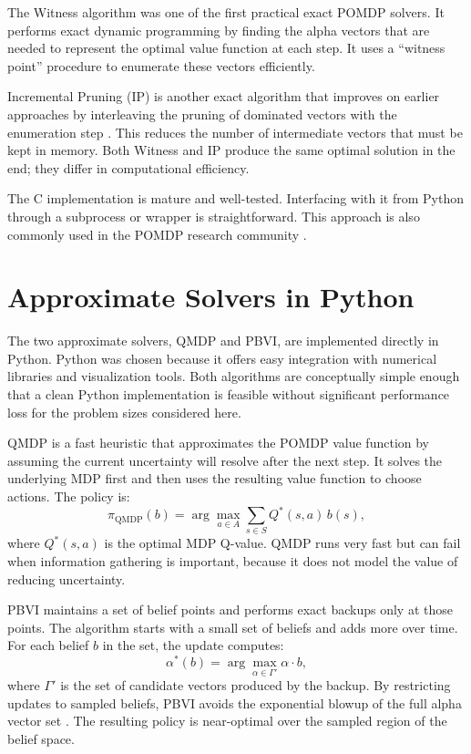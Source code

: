 The Witness algorithm was one of the first practical exact POMDP solvers.
It performs exact dynamic programming by finding the alpha vectors that are needed to represent the optimal value function at each step.
It uses a ``witness point'' procedure to enumerate these vectors efficiently.

Incremental Pruning (IP) is another exact algorithm that improves on earlier approaches by interleaving the pruning of dominated vectors with the enumeration step \cite{incrementalPruningNotes}.
This reduces the number of intermediate vectors that must be kept in memory.
Both Witness and IP produce the same optimal solution in the end; they differ in computational efficiency.

The C implementation is mature and well-tested.
Interfacing with it from Python through a subprocess or wrapper is straightforward.
This approach is also commonly used in the POMDP research community \cite{gaoTechnicalQASite2021}.


\section{Approximate Solvers in Python}
\label{sec:approx}

The two approximate solvers, QMDP and PBVI, are implemented directly in Python.
Python was chosen because it offers easy integration with numerical libraries and visualization tools.
Both algorithms are conceptually simple enough that a clean Python implementation is feasible without significant performance loss for the problem sizes considered here.

QMDP \cite{zhangModelApproximationScheme1997} is a fast heuristic that approximates the POMDP value function by assuming the current uncertainty will resolve after the next step.
It solves the underlying MDP first and then uses the resulting value function to choose actions.
The policy is:
\begin{equation}
  \pi_\text{QMDP}(b) = \arg\max_{a \in A} \sum_{s \in S} Q^*(s, a)\, b(s),
\end{equation}
where $Q^*(s, a)$ is the optimal MDP Q-value.
QMDP runs very fast but can fail when information gathering is important, because it does not model the value of reducing uncertainty.

PBVI \cite{pineauPointbasedValueIteration} maintains a set of belief points and performs exact backups only at those points.
The algorithm starts with a small set of beliefs and adds more over time.
For each belief $b$ in the set, the update computes:
\begin{equation}
  \alpha^*(b) = \arg\max_{\alpha \in \Gamma'} \alpha \cdot b,
\end{equation}
where $\Gamma'$ is the set of candidate vectors produced by the backup.
By restricting updates to sampled beliefs, PBVI avoids the exponential blowup of the full alpha vector set \cite{spaanPointbasedPOMDPAlgorithm2004}.
The resulting policy is near-optimal over the sampled region of the belief space.


